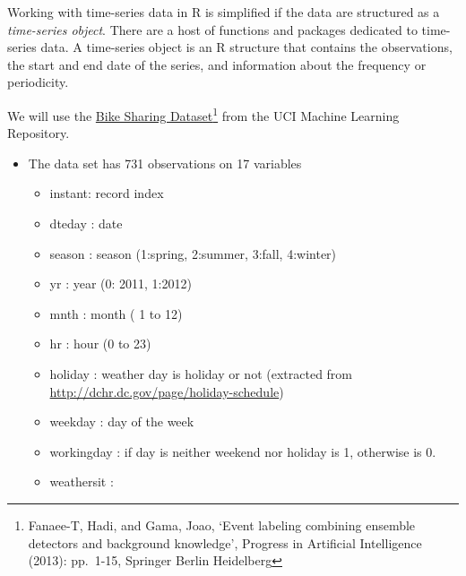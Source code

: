 \documentclass[]{book}
\providecommand{\tightlist}{%
  \setlength{\itemsep}{0pt}\setlength{\parskip}{0pt}}
\let\rmarkdownfootnote\footnote%
\def\footnote{\protect\rmarkdownfootnote}
\begin{document}
Working with time-series data in R is simplified if the data are structured as a \emph{time-series object}. There are a host of functions and packages dedicated to time-series data. A time-series object is an R structure that contains the observations, the start and end date of the series, and information about the frequency or periodicity.

We will use the \href{https://archive.ics.uci.edu/ml/machine-learning-databases/00275/}{Bike Sharing Dataset}\footnote{Fanaee-T, Hadi, and Gama, Joao, `Event labeling combining ensemble detectors and background knowledge', Progress in Artificial Intelligence (2013): pp.~1-15, Springer Berlin Heidelberg} from the UCI Machine Learning Repository.

\begin{itemize}
\tightlist
\item
  The data set has 731 observations on 17 variables

  \begin{itemize}
  \tightlist
  \item
    instant: record index
  \item
    dteday : date
  \item
    season : season (1:spring, 2:summer, 3:fall, 4:winter)
  \item
    yr : year (0: 2011, 1:2012)
  \item
    mnth : month ( 1 to 12)
  \item
    hr : hour (0 to 23)
  \item
    holiday : weather day is holiday or not (extracted from \url{http://dchr.dc.gov/page/holiday-schedule})
  \item
    weekday : day of the week
  \item
    workingday : if day is neither weekend nor holiday is 1, otherwise is 0.
  \item
    weathersit :


\end{itemize}
\end{itemize}
\end{document}
